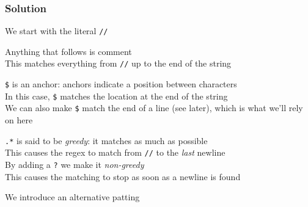 \begin{frame}
  \frametitle{Solution}
  \begin{center} \ttfamily
  \end{center}
  \vskip5mm
  \vskip2mm
  \begin{overprint}
    \begin{center}
      We start with the literal \texttt{//}
    \end{center}

    \begin{center}
      Anything that follows is comment \\
      This matches everything from \texttt{//} up to the end of the string
    \end{center}

    \begin{center}
      \texttt{\$} is an anchor: anchors indicate a position between characters \\
      In this case, \texttt{\$} matches the location at the end of the string \\
      We can also make \texttt{\$} match the end of a line (see later), which is what we'll rely on here
    \end{center}

    \begin{center}
      \texttt{.*} is said to be \emph{greedy}: it matches as much as possible \\
      This causes the regex to match from \texttt{//} to the \emph{last} newline \\
      By adding a \texttt{?} we make it \emph{non-greedy} \\
      This causes the matching to stop as soon as a newline is found
    \end{center}

    \begin{center}
      We introduce an alternative patting
    \end{center}


\end{overprint}
\end{frame}

